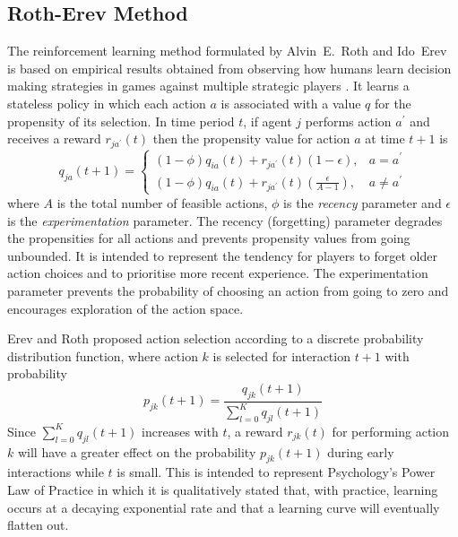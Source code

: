 \subsection{Roth-Erev Method}
\label{sec:rotherev}
The reinforcement learning method formulated by Alvin~E.~Roth and Ido~Erev is
based on empirical results obtained from observing how humans learn decision
making strategies in games against multiple strategic players
\cite{roth:games,roth:aer}.  It learns a stateless policy in which each action
$a$ is associated with a value $q$ for the propensity of its selection.  In
time period $t$, if agent $j$ performs action $a^\prime$ and receives a reward
$r_{ja^\prime}(t)$ then the propensity value for action $a$ at time $t+1$ is
\begin{equation}
q_{ja}(t+1) =
\begin{cases}
(1-\phi)q_{ia}(t) + r_{ja^\prime}(t)(1-\epsilon), & \text{$a = a^\prime$} \\
(1-\phi)q_{ia}(t) + r_{ja^\prime}(t)(\frac{\epsilon}{A-1}), & \text{$a \ne
a^\prime$}
\end{cases}
\end{equation}
where $A$ is the total number of feasible actions, $\phi$ is the
\textit{recency} parameter and $\epsilon$ is the \textit{experimentation} parameter.  The recency (forgetting) parameter
degrades the propensities for all actions and prevents propensity values from
going unbounded.  It is intended to represent the tendency for players to forget
older action choices and to prioritise more recent experience.  The
experimentation parameter prevents the probability of choosing an action from
going to zero and encourages exploration of the action space.

Erev and Roth proposed action selection according to a discrete probability
distribution function, where action $k$ is selected for interaction $t+1$ with
probability
\begin{equation}
\label{eq:re_prob}
p_{jk}(t+1) = \frac{q_{jk}(t+1)}{\sum_{l=0}^K q_{jl}(t+1)}
\end{equation}
Since $\sum_{l=0}^K q_{jl}(t+1)$ increases with $t$, a reward $r_{jk}(t)$ for
performing action $k$ will have a greater effect on the probability
$p_{jk}(t+1)$ during early interactions while $t$ is small.  This is intended
to represent Psychology's Power Law of Practice in which it is qualitatively
stated that, with practice, learning occurs at a decaying exponential rate and
that a learning curve will eventually flatten out.

